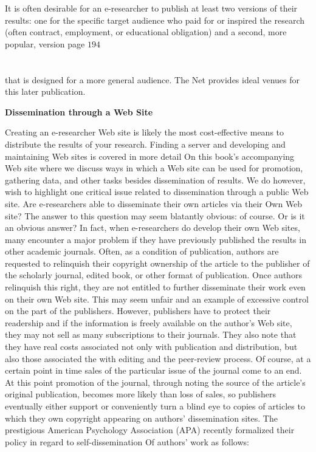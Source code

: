 \documentclass{book}
\begin{document}
It is often desirable for an e-researcher to publish at least two versions of their results: one for the specific target audience who paid for or inspired the research (often contract, employment, or educational obligation) and a second, more popular, version\newpage
page $194$\\\\\\
that is designed for a more general audience. The Net provides ideal venues for this later publication.\par 
\textbf{Dissemination through a Web Site}\par 
 Creating an e-researcher Web site is likely the most cost-effective means to distribute the results of your research. Finding a server and developing and maintaining Web sites is covered in more detail On this book's accompanying Web site where we discuss ways in which a Web site can be used for promotion, gathering data, and other tasks besides dissemination of results. We do however, wish to highlight one critical issue related to dissemination through a public Web site. Are e-researchers able to disseminate their own articles via their Own Web site? The answer to this question may seem blatantly obvious: of course. Or is it an obvious answer? In fact, when e-researchers do develop their own Web sites, many encounter a major problem if they have previously published the results in other academic journals. Often, as a condition of publication, authors are requested to relinquish their copyright ownership of the article to the publisher of the scholarly journal, edited book, or other format of publication. Once authors relinquish this right, they are not entitled to further disseminate their work even on their own Web site. This may seem unfair and an example of excessive control on the part of the publishers. However, publishers have to protect their readership and if the information is freely available on the author's Web site, they may not sell as many subscriptions to their journals. They also note that they have real costs associated not only with publication and distribution, but also those associated the with editing and the peer-review process. Of course, at a certain point in time sales of the particular issue of the journal come to an end. At this point promotion of the journal, through noting the source of the article's original publication, becomes more likely than loss of sales, so publishers eventually either support or conveniently turn a blind eye to copies of articles to which they own copyright appearing on authors' dissemination sites. The prestigious American Psychology Association (APA) recently formalized their policy in regard to self-dissemination Of authors' work as follows:\par 
\end{document}
